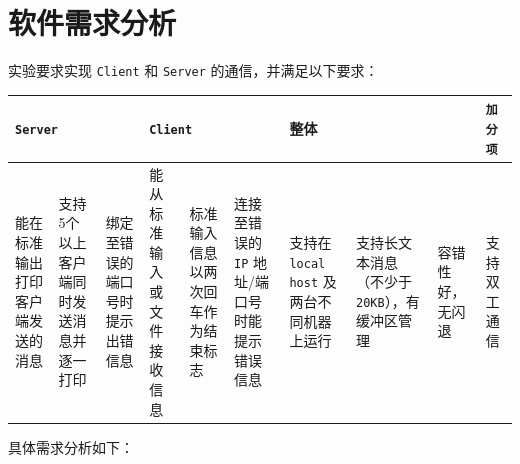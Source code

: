 \documentclass{article}
\begin{document}
\section{软件需求分析}

实验要求实现 \texttt{Client} 和 \texttt{Server} 的通信，并满足以下要求：

\begin{table}[H]
	\centering
	\begin{tabularx}{0.95\textwidth}{|X|X|X|X|X|X|X|X|X|X|}
		\hline
		\multicolumn{3}{|X|}{\texttt{Server}} & \multicolumn{3}{|X|}{\texttt{Client}}   & \multicolumn{3}{|X|}{整体}   & \texttt{加分项} \\
		\hline
		能在标准输出打印客户端发送的消息      & 支持5个以上客户端同时发送消息并逐一打印 & 绑定至错误的端口号时提示出错信息 & 能从标准输入或文件接收信息 & 标准输入信息以两次回车作为结束标志 & 连接至错误的 \texttt{IP} 地址/端口号时能提示错误信息 & 支持在 \texttt{local host} 及两台不同机器上运行 & 支持长文本消息（不少于 \texttt{20KB}），有缓冲区管理 & 容错性好，无闪退 & 支持双工通信 \\
		\hline
	\end{tabularx}
\end{table}

具体需求分析如下：
\end{document}
